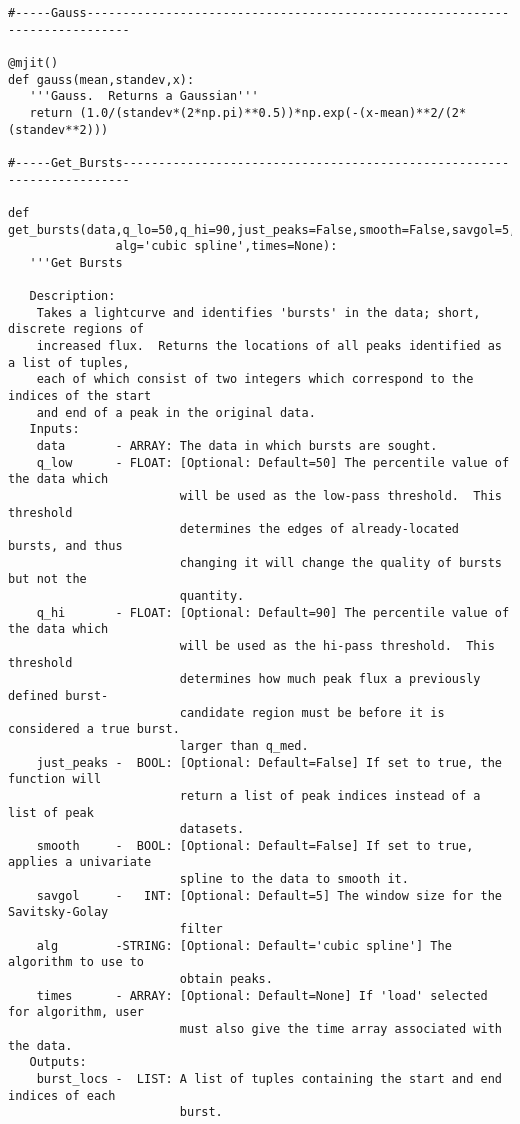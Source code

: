\begin{verbatim}
#-----Gauss----------------------------------------------------------------------------

@mjit()
def gauss(mean,standev,x):
   '''Gauss.  Returns a Gaussian'''
   return (1.0/(standev*(2*np.pi)**0.5))*np.exp(-(x-mean)**2/(2*(standev**2)))

#-----Get_Bursts-----------------------------------------------------------------------

def get_bursts(data,q_lo=50,q_hi=90,just_peaks=False,smooth=False,savgol=5,
               alg='cubic spline',times=None):
   '''Get Bursts

   Description:
    Takes a lightcurve and identifies 'bursts' in the data; short, discrete regions of
    increased flux.  Returns the locations of all peaks identified as a list of tuples,
    each of which consist of two integers which correspond to the indices of the start
    and end of a peak in the original data.
   Inputs:
    data       - ARRAY: The data in which bursts are sought.
    q_low      - FLOAT: [Optional: Default=50] The percentile value of the data which
                        will be used as the low-pass threshold.  This threshold
                        determines the edges of already-located bursts, and thus
                        changing it will change the quality of bursts but not the
                        quantity.
    q_hi       - FLOAT: [Optional: Default=90] The percentile value of the data which
                        will be used as the hi-pass threshold.  This threshold
                        determines how much peak flux a previously defined burst-
                        candidate region must be before it is considered a true burst.
                        larger than q_med.
    just_peaks -  BOOL: [Optional: Default=False] If set to true, the function will
                        return a list of peak indices instead of a list of peak
                        datasets.
    smooth     -  BOOL: [Optional: Default=False] If set to true, applies a univariate
                        spline to the data to smooth it.
    savgol     -   INT: [Optional: Default=5] The window size for the Savitsky-Golay
                        filter
    alg        -STRING: [Optional: Default='cubic spline'] The algorithm to use to
                        obtain peaks.
    times      - ARRAY: [Optional: Default=None] If 'load' selected for algorithm, user
                        must also give the time array associated with the data.
   Outputs:
    burst_locs -  LIST: A list of tuples containing the start and end indices of each
                        burst.


\end{verbatim}
